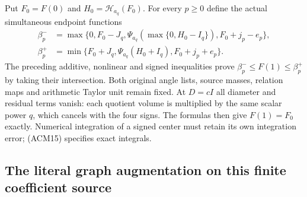 Put $F_0=F(0)$ and $H_0=\mathscr H_{a_q}(F_0)$. For every $p\geq0$
define the actual simultaneous endpoint functions
\[
\begin{split}
 \beta_p^-&=\max\{0,F_0-J_q,
       \Psi_{a_q}(\max\{0,H_0-I_q\}),F_0+j_p-e_p\},\\
 \beta_p^+&=\min\{F_0+J_q,
       \Psi_{a_q}(H_0+I_q),F_0+j_p+e_p\}.
\end{split}
\tag{ACM16}
\]
The preceding additive, nonlinear and signed inequalities prove
$\beta_p^-\leq F(1)\leq\beta_p^+$ by taking their intersection.
Both original angle lists, source masses, relation maps and arithmetic
Taylor unit remain fixed. At $D=cI$ all diameter and residual terms
vanish: each quotient volume is multiplied by the same scalar power
$q$, which cancels with the four signs. The formulas then give
$F(1)=F_0$ exactly. Numerical integration of a signed center must
retain its own integration error; (ACM15) specifies exact integrals.

\subsection{The literal graph augmentation on this finite coefficient source}

